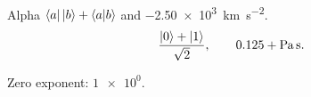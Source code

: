 \documentclass[12pt,aspectratio=43]{beamer}
\begin{document}
\begin{frame}{Alpha}
$\bra{a}\ket{b}+\braket{a|b}$ and \SI{-2.50e3}{\kilo\metre\per\second\squared}.
\[ \frac{\ket0+\ket1}{\sqrt2},\qquad \num{0.125}+\si{\pascal\second}. \]
\par Zero exponent: $\num{1e0}$.
\end{frame}
\end{document}

